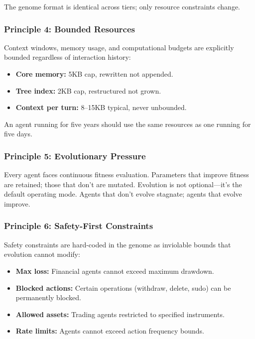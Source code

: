 \documentclass{article}
\begin{document}
The genome format is identical across tiers; only resource constraints change.

\subsubsection{Principle 4: Bounded Resources}

Context windows, memory usage, and computational budgets are explicitly bounded regardless of interaction history:

\begin{itemize}[leftmargin=*]
    \item \textbf{Core memory:} 5KB cap, rewritten not appended.
    \item \textbf{Tree index:} 2KB cap, restructured not grown.
    \item \textbf{Context per turn:} 8--15KB typical, never unbounded.
\end{itemize}

An agent running for five years should use the same resources as one running for five days.

\subsubsection{Principle 5: Evolutionary Pressure}

Every agent faces continuous fitness evaluation. Parameters that improve fitness are retained; those that don't are mutated. Evolution is not optional—it's the default operating mode. Agents that don't evolve stagnate; agents that evolve improve.

\subsubsection{Principle 6: Safety-First Constraints}

Safety constraints are hard-coded in the genome as inviolable bounds that evolution cannot modify:

\begin{itemize}[leftmargin=*]
    \item \textbf{Max loss:} Financial agents cannot exceed maximum drawdown.
    \item \textbf{Blocked actions:} Certain operations (withdraw, delete, sudo) can be permanently blocked.
    \item \textbf{Allowed assets:} Trading agents restricted to specified instruments.
    \item \textbf{Rate limits:} Agents cannot exceed action frequency bounds.
\end{itemize}
\end{document}
